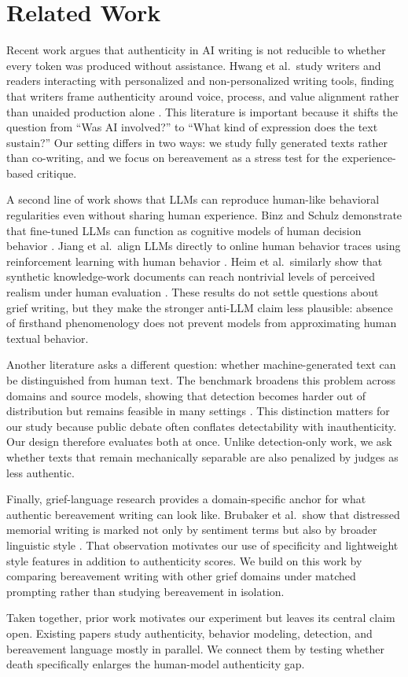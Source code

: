 \section{Related Work}
\label{sec:related-work}

Recent work argues that authenticity in AI writing is not reducible to whether every token was produced without assistance. Hwang et al.\ study writers and readers interacting with personalized and non-personalized writing tools, finding that writers frame authenticity around voice, process, and value alignment rather than unaided production alone \citep{hwang2024authenticity}. This literature is important because it shifts the question from ``Was AI involved?'' to ``What kind of expression does the text sustain?'' Our setting differs in two ways: we study fully generated texts rather than co-writing, and we focus on bereavement as a stress test for the experience-based critique.

A second line of work shows that LLMs can reproduce human-like behavioral regularities even without sharing human experience. Binz and Schulz demonstrate that fine-tuned LLMs can function as cognitive models of human decision behavior \citep{binz2023cognitive}. Jiang et al.\ align LLMs directly to online human behavior traces using reinforcement learning with human behavior \citep{jiang2024real}. Heim et al.\ similarly show that synthetic knowledge-work documents can reach nontrivial levels of perceived realism under human evaluation \citep{heim2024authentic}. These results do not settle questions about grief writing, but they make the stronger anti-LLM claim less plausible: absence of firsthand phenomenology does not prevent models from approximating human textual behavior.

Another literature asks a different question: whether machine-generated text can be distinguished from human text. The \mage benchmark broadens this problem across domains and source models, showing that detection becomes harder out of distribution but remains feasible in many settings \citep{li2024mage}. This distinction matters for our study because public debate often conflates detectability with inauthenticity. Our design therefore evaluates both at once. Unlike detection-only work, we ask whether texts that remain mechanically separable are also penalized by judges as less authentic.

Finally, grief-language research provides a domain-specific anchor for what authentic bereavement writing can look like. Brubaker et al.\ show that distressed memorial writing is marked not only by sentiment terms but also by broader linguistic style \citep{brubaker2012grief}. That observation motivates our use of specificity and lightweight style features in addition to authenticity scores. We build on this work by comparing bereavement writing with other grief domains under matched prompting rather than studying bereavement in isolation.

Taken together, prior work motivates our experiment but leaves its central claim open. Existing papers study authenticity, behavior modeling, detection, and bereavement language mostly in parallel. We connect them by testing whether death specifically enlarges the human-model authenticity gap.
